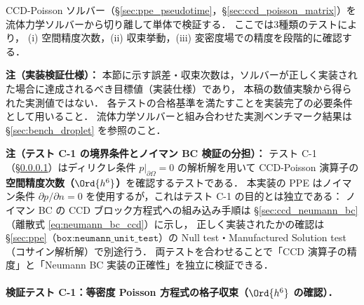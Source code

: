 %

CCD-Poisson ソルバー（§\ref{sec:ppe_pseudotime}，§\ref{sec:ccd_poisson_matrix}）を
流体力学ソルバーから切り離して単体で検証する．
ここでは3種類のテストにより，
(i) 空間精度次数，(ii) 収束挙動，(iii) 変密度場での精度を段階的に確認する．

\noindent\textbf{注（実装検証仕様）：}
本節に示す誤差・収束次数は，ソルバーが正しく実装された場合に達成されるべき目標値（実装仕様）であり，
本稿の数値実験から得られた実測値ではない．
各テストの合格基準を満たすことを実装完了の必要条件として用いること．
流体力学ソルバーと組み合わせた実測ベンチマーク結果は §\ref{sec:bench_droplet} を参照のこと．

\noindent\textbf{注（テスト C-1 の境界条件とノイマン BC 検証の分担）：}
テスト C-1（§\ref{sec:ccd_test_c1}）はディリクレ条件 $p|_{\partial\Omega}=0$ の解析解を用いて
CCD-Poisson 演算子の\textbf{空間精度次数（$\Ord{h^6}$）}を確認するテストである．
本実装の PPE はノイマン条件 $\partial p/\partial n = 0$ を使用するが，これはテスト C-1 の目的とは独立である：
ノイマン BC の CCD ブロック方程式への組み込み手順は §\ref{sec:ccd_neumann_bc}（離散式 \eqref{eq:neumann_bc_ccd}）に示し，
正しく実装されたかの確認は §\ref{sec:ppe}（$\texttt{box:neumann\_unit\_test}$）の
Null test・Manufactured Solution test（コサイン解析解）で別途行う．
両テストを合わせることで「CCD 演算子の精度」と「Neumann BC 実装の正確性」を独立に検証できる．

\paragraph{検証テスト C-1：等密度 Poisson 方程式の格子収束（\texorpdfstring{$\Ord{h^6}$}{O(h\textasciicircum 6)} の確認）．}
\label{sec:ccd_test_c1}


